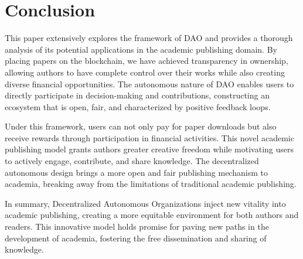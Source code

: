\documentclass[lettersize,journal]{IEEEtran}
\begin{document}
\section{Conclusion}
This paper extensively explores the framework of DAO and provides a thorough analysis of its potential applications in the academic publishing domain. By placing papers on the blockchain, we have achieved transparency in ownership, allowing authors to have complete control over their works while also creating diverse financial opportunities. The autonomous nature of DAO enables users to directly participate in decision-making and contributions, constructing an ecosystem that is open, fair, and characterized by positive feedback loops.

Under this framework, users can not only pay for paper downloads but also receive rewards through participation in financial activities. This novel academic publishing model grants authors greater creative freedom while motivating users to actively engage, contribute, and share knowledge. The decentralized autonomous design brings a more open and fair publishing mechanism to academia, breaking away from the limitations of traditional academic publishing.

In summary, Decentralized Autonomous Organizations inject new vitality into academic publishing, creating a more equitable environment for both authors and readers. This innovative model holds promise for paving new paths in the development of academia, fostering the free dissemination and sharing of knowledge.

\end{document}
